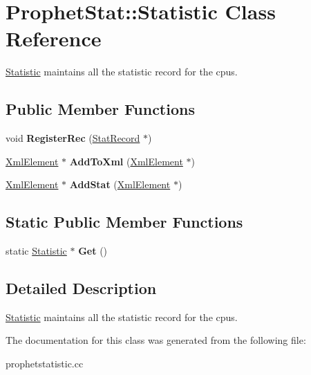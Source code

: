 \hypertarget{classProphetStat_1_1Statistic}{
\section{ProphetStat::Statistic Class Reference}
\label{classProphetStat_1_1Statistic}
}


\hyperlink{classProphetStat_1_1Statistic}{Statistic} maintains all the statistic record for the cpus.  


\subsection*{Public Member Functions}
\begin{DoxyCompactItemize}
\item 
\hypertarget{classProphetStat_1_1Statistic_aaaf8c7d24fec7daaa91ae86cf34df8e7}{
void {\bfseries RegisterRec} (\hyperlink{classProphetStat_1_1StatRecord}{StatRecord} $\ast$)}
\label{classProphetStat_1_1Statistic_aaaf8c7d24fec7daaa91ae86cf34df8e7}

\item 
\hypertarget{classProphetStat_1_1Statistic_a97156929bf7aea0054539e2ee14ce6ed}{
\hyperlink{classXmlElement}{XmlElement} $\ast$ {\bfseries AddToXml} (\hyperlink{classXmlElement}{XmlElement} $\ast$)}
\label{classProphetStat_1_1Statistic_a97156929bf7aea0054539e2ee14ce6ed}

\item 
\hypertarget{classProphetStat_1_1Statistic_a42df9e3d53fa6f1097662d2b2162f4f9}{
\hyperlink{classXmlElement}{XmlElement} $\ast$ {\bfseries AddStat} (\hyperlink{classXmlElement}{XmlElement} $\ast$)}
\label{classProphetStat_1_1Statistic_a42df9e3d53fa6f1097662d2b2162f4f9}

\end{DoxyCompactItemize}
\subsection*{Static Public Member Functions}
\begin{DoxyCompactItemize}
\item 
\hypertarget{classProphetStat_1_1Statistic_a20d8045bf9fa6c491d58c810c7bcfdf1}{
static \hyperlink{classProphetStat_1_1Statistic}{Statistic} $\ast$ {\bfseries Get} ()}
\label{classProphetStat_1_1Statistic_a20d8045bf9fa6c491d58c810c7bcfdf1}

\end{DoxyCompactItemize}


\subsection{Detailed Description}
\hyperlink{classProphetStat_1_1Statistic}{Statistic} maintains all the statistic record for the cpus. 

The documentation for this class was generated from the following file:\begin{DoxyCompactItemize}
\item 
prophetstatistic.cc\end{DoxyCompactItemize}
